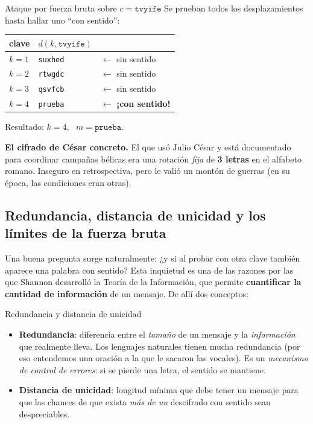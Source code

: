 \documentclass[11pt,a4paper]{article}
\begin{document}
\begin{practbox}{Ataque por fuerza bruta sobre $c=\texttt{tvyife}$}
Se prueban todos los desplazamientos hasta hallar uno ``con sentido'':
\begin{center}
\renewcommand{\arraystretch}{1.15}
\begin{tabular}{lll}
\toprule
clave & $d(k,\texttt{tvyife})$ & \\
\midrule
$k=1$ & \texttt{suxhed} & $\leftarrow$ sin sentido\\
$k=2$ & \texttt{rtwgdc} & $\leftarrow$ sin sentido\\
$k=3$ & \texttt{qsvfcb} & $\leftarrow$ sin sentido\\
$k=4$ & \texttt{prueba} & $\leftarrow$ \textbf{¡con sentido!}\\
\bottomrule
\end{tabular}
\end{center}
Resultado: $k=4$, \ $m=\texttt{prueba}$.
\end{practbox}

\begin{notebox}
\textbf{El cifrado de César concreto.} El que usó Julio César y está documentado para
coordinar campañas bélicas era una rotación \emph{fija} de \textbf{3 letras} en el alfabeto
romano. Inseguro en retrospectiva, pero le valió un montón de guerras (en su época, las
condiciones eran otras).
\end{notebox}

\subsection{Redundancia, distancia de unicidad y los límites de la fuerza bruta}
Una buena pregunta surge naturalmente: ¿y si al probar con otra clave también aparece una
palabra con sentido? Esta inquietud es una de las razones por las que Shannon desarrolló la
Teoría de la Información, que permite \textbf{cuantificar la cantidad de información} de un
mensaje. De allí dos conceptos:

\begin{defbox}{Redundancia y distancia de unicidad}
\begin{itemize}[leftmargin=1.4em,itemsep=2pt]
  \item \textbf{Redundancia}: diferencia entre el \emph{tamaño} de un mensaje y la
        \emph{información} que realmente lleva. Los lenguajes naturales tienen mucha
        redundancia (por eso entendemos una oración a la que le sacaron las vocales). Es un
        \emph{mecanismo de control de errores}: si se pierde una letra, el sentido se
        mantiene.
  \item \textbf{Distancia de unicidad}: longitud mínima que debe tener un mensaje para que las
        chances de que exista \emph{más de un} descifrado con sentido sean despreciables.
\end{itemize}
\end{defbox}
\end{document}

